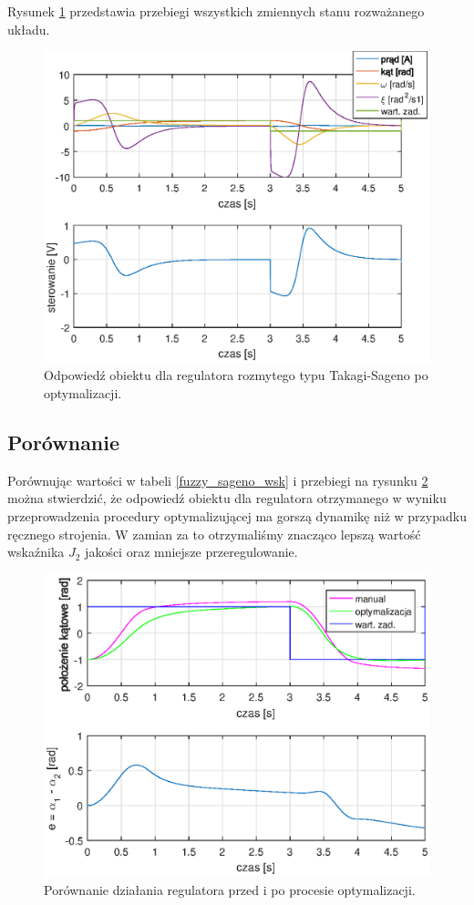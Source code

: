 \FloatBarrier
Rysunek \ref{fuzzy_sageno_odp} przedstawia przebiegi wszystkich zmiennych stanu rozważanego układu.
\begin{figure}[h!]
	\centering
	\includegraphics[scale = 1]{fig/fuzzy_sagenoOpt_odp.eps}
	\caption		
	{Odpowied\'z obiektu dla regulatora rozmytego typu Takagi-Sageno po optymalizacji.}
	\label{fuzzy_sageno_odp}
\end{figure}
\FloatBarrier
\newpage
\subsection{Porównanie}

Porównując wartości w tabeli \ref{fuzzy_sageno_wsk} i przebiegi na rysunku \ref{fuzzy_sageno_por} można stwierdzić, że odpowied\'z obiektu dla regulatora otrzymanego w wyniku przeprowadzenia procedury optymalizującej ma gorszą dynamikę niż w przypadku ręcznego strojenia. W zamian za to otrzymaliśmy znacząco lepszą wartość wska\'znika $J_2$ jakości oraz mniejsze przeregulowanie.
\begin{figure}[h!]
	\centering
	\includegraphics[scale = 0.8]{fig/por_fuzzy_sageno.eps}
	\caption		
	{Porównanie działania regulatora przed i po procesie optymalizacji.}
	\label{fuzzy_sageno_por}
\end{figure}

